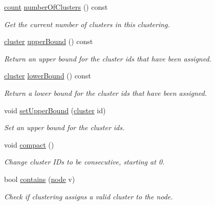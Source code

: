 \begin{DoxyCompactItemize}
\hyperlink{namespace_ensemble_clustering_a2482e94ca22a0c6544a5a9173186fde8}{count} \hyperlink{class_ensemble_clustering_1_1_clustering_a7eb03661a933eff8176af0e073da2ef4}{number\-Of\-Clusters} () const 
\begin{DoxyCompactList}\small\item\em Get the current number of clusters in this clustering. \end{DoxyCompactList}\item 
\hyperlink{namespace_ensemble_clustering_a5ae38234e207add524443be6e597b970}{cluster} \hyperlink{class_ensemble_clustering_1_1_clustering_ae0b22bda843f96f9428d05aa582cfe4b}{upper\-Bound} () const 
\begin{DoxyCompactList}\small\item\em Return an upper bound for the cluster ids that have been assigned. \end{DoxyCompactList}\item 
\hyperlink{namespace_ensemble_clustering_a5ae38234e207add524443be6e597b970}{cluster} \hyperlink{class_ensemble_clustering_1_1_clustering_ab64cf7248533ea358d7621ca8296b085}{lower\-Bound} () const 
\begin{DoxyCompactList}\small\item\em Return a lower bound for the cluster ids that have been assigned. \end{DoxyCompactList}\item 
void \hyperlink{class_ensemble_clustering_1_1_clustering_adb704c4cbb2205b7858ac2d7f0f5014f}{set\-Upper\-Bound} (\hyperlink{namespace_ensemble_clustering_a5ae38234e207add524443be6e597b970}{cluster} id)
\begin{DoxyCompactList}\small\item\em Set an upper bound for the cluster ids. \end{DoxyCompactList}\item 
void \hyperlink{class_ensemble_clustering_1_1_clustering_a51a9ed79e7d14cd1739be0034b35e835}{compact} ()
\begin{DoxyCompactList}\small\item\em Change cluster I\-Ds to be consecutive, starting at 0. \end{DoxyCompactList}\item 
bool \hyperlink{class_ensemble_clustering_1_1_clustering_a53f22ed7ab2a41979f5cdf9b99b5e1de}{contains} (\hyperlink{namespace_ensemble_clustering_ae829290aeccd1a420b17a37fd901f114}{node} v)
\begin{DoxyCompactList}\small\item\em Check if clustering assigns a valid cluster to the node. \end{DoxyCompactList}\item 

\end{DoxyCompactItemize}
